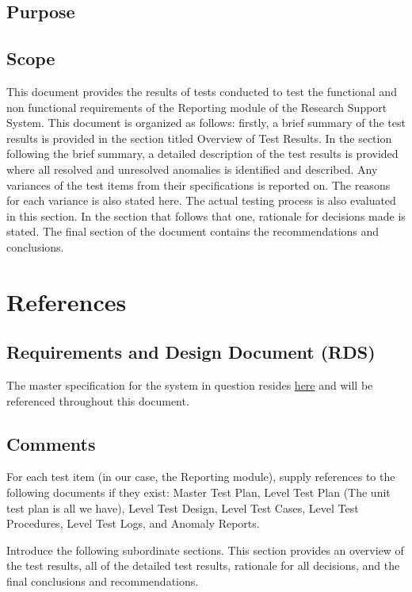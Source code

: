 \subsection{Purpose}

\subsection{Scope}
This document provides the results of tests conducted to test the functional and non functional requirements of the Reporting module of the Research Support System. This document is organized as follows: firstly, a brief summary of the test results is provided in the section titled Overview of Test Results. In the section following the brief summary, a detailed description of the test results is provided where all resolved and unresolved anomalies is identified and described. Any variances of the test items from their specifications is reported on. The reasons for each variance is also stated here. The actual testing process is also evaluated in this section. In the section that follows that one, rationale for decisions made is stated. The final section of the document contains the recommendations and conclusions.

\section{References} \label{sectionReferences}
\subsection{Requirements and Design Document (RDS)}
\hypersetup{
	linkcolor = blue       
}   
The master specification for the system in question resides \href{https://clickup.up.ac.za/bbcswebdav/pid-791422-dt-content-rid-8256558_1/xid-8256558_1}{here} and will be referenced throughout this document.

\subsection{Comments} %
For each test item (in our case, the Reporting module), supply references to the following documents if they exist: Master Test
Plan, Level Test Plan (The unit test plan is all we have), Level Test Design, Level Test Cases, Level Test Procedures, Level Test Logs,
and Anomaly Reports.

Introduce the following subordinate sections. This section provides an overview of the test results, all
of the detailed test results, rationale for all decisions, and the final conclusions and recommendations.